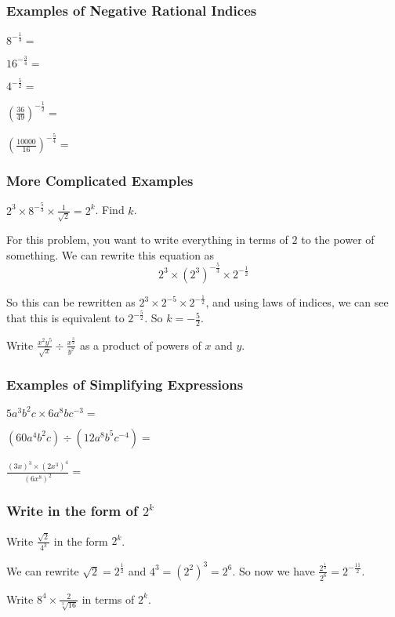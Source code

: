 \documentclass[../maths.tex]{subfiles}
\begin{document}
\subsubsection*{Examples of Negative Rational Indices}

\ex $8^{-\frac{1}{3}} = $

\ex $16^{-\frac{3}{4}} = $

\ex $4^{-\frac{5}{2}} = $

\ex $\left(\frac{36}{49}\right)^{-\frac{1}{2}} = $

\ex $\left(\frac{10000}{16}\right)^{-\frac{5}{4}} = $

\subsubsection*{More Complicated Examples}

\begin{example}
    $2^3\times 8^{-\frac{5}{3}} \times \frac{1}{\sqrt{2}} = 2^k$. Find $k$.

    For this problem, you want to write everything in terms of $2$ to the power of something. We can rewrite this equation as 
    \[ 2^3 \times (2^3)^{-\frac{5}{3}} \times 2^{-\frac{1}{2}} \]

    So this can be rewritten as $2^3\times 2^{-5} \times 2^{-\frac{1}{2}}$, and using laws of indices, we can see that this is equivalent to 
    $2^{-\frac{5}{2}}$. So $k = -\frac{5}{2}$.
\end{example}
\ex Write $\frac{x^2y^5}{\sqrt{x}}\div \frac{x^{\frac{3}{2}}}{y^7}$ as a product of powers of $x$ and $y$.

\subsubsection*{Examples of Simplifying Expressions}

\ex $5a^3b^2c \times 6a^8bc^{-3} = $

\ex $(60a^4b^2c) \div (12a^8b^5c^{-4}) = $

\ex $\frac{(3x)^3\times (2x^3)^4}{(6x^8)^2} = $

\subsubsection*{Write in the form of $2^k$}
\smallbreak
\begin{example}
    Write $\frac{\sqrt{2}}{4^3}$ in the form $2^k$.

    We can rewrite $\sqrt{2} = 2^{\frac{1}{2}}$ and $4^3 = (2^2)^3 = 2^6$. So now we have $\frac{2^{\frac{1}{2}}}{2^6} = 2^{-\frac{11}{2}}$.
\end{example}
\ex Write $8^4 \times \frac{2}{\sqrt[3]{16}}$ in terms of $2^k$.
\end{document}
